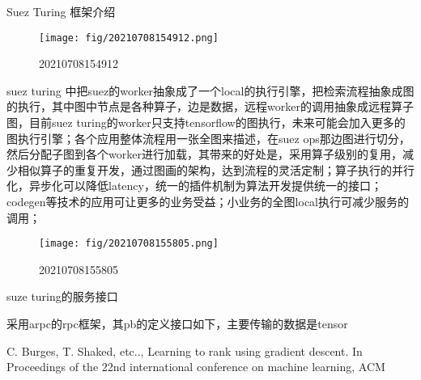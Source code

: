 	Suez Turing 框架介绍


	\begin{figure}[h]
	\centering
	\texttt{[image: fig/20210708154912.png]}
	\caption{20210708154912} \label{fig:gansamples}
	\end{figure}


	suez turing 中把suez的worker抽象成了一个local的执行引擎，把检索流程抽象成图的执行，其中图中节点是各种算子，边是数据，远程worker的调用抽象成远程算子图，目前suez turing的worker只支持tensorflow的图执行，未来可能会加入更多的图执行引擎；各个应用整体流程用一张全图来描述，在suez ops那边图进行切分，然后分配子图到各个worker进行加载，其带来的好处是，采用算子级别的复用，减少相似算子的重复开发，通过图画的架构，达到流程的灵活定制；算子执行的并行化，异步化可以降低latency，统一的插件机制为算法开发提供统一的接口；codegen等技术的应用可让更多的业务受益；小业务的全图local执行可减少服务的调用；

	

	\begin{figure}[h]
	\centering
	\texttt{[image: fig/20210708155805.png]}
	\caption{20210708155805} \label{fig:gansamples}
	\end{figure}


	suze turing的服务接口

	采用arpc的rpc框架，其pb的定义接口如下，主要传输的数据是tensor



\begin{thebibliography}{99}
 C. Burges, T. Shaked, etc.., Learning to rank 
using gradient descent. In Proceedings of the 22nd international 
conference on machine learning, ACM
\end{thebibliography}

 
